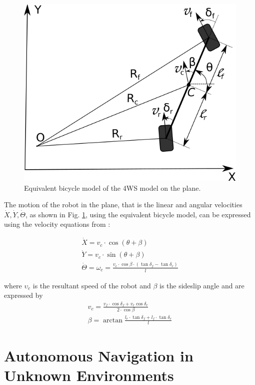\documentclass[conference]{IEEEtran}
\begin{document}
\begin{figure}[!ht]
	\centering
	\includegraphics[width=0.7\linewidth]{Figures/4ws_xy_plane.png}%
	\caption{Equivalent bicycle model of the 4WS model on the plane.}
	\label{fig:4ws_xy_plane}
\end{figure}

The motion of the robot in the plane, that is the linear and angular velocities $\dot X, \dot Y, \dot\Theta$, as shown in Fig. \ref{fig:4ws_xy_plane}, using the equivalent bicycle model, can be expressed using the velocity equations from \cite{4ws_trajectory_planning}:

\begin{gather}
	\dot X = v_c \cdot \cos(\theta + \beta)
	\label{eq:x_dot}\\
	\dot Y = v_c \cdot \sin(\theta + \beta)
	\label{eq:y_dot}\\
	\dot \Theta = \omega_c = \frac{v_c \cdot \cos{\beta} \cdot (\tan{\delta_f - \tan{\delta_r}})}{l}
	\label{eq:th_dot}
\end{gather}

\noindent
where $\upsilon_c$ is the resultant speed of the robot and $\beta$ is the sideslip angle and are expressed by
\begin{gather}
	v_c = \frac{v_f \cdot \cos{\delta_f} + v_r \cos{\delta_r}}{2 \cdot \cos{\beta}}
	\label{eq:v_c_f_r}\\[0.1cm]
	\beta = \arctan{\frac{l_r \cdot \tan{\delta_f} + l_f \cdot \tan{\delta_r}}{l}}
	\label{eq:beta}
\end{gather}

\bigskip
\section{Autonomous Navigation in Unknown Environments} \label{sec:autonav}
\end{document}
